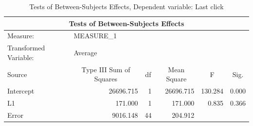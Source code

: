 \documentclass[a4paper]{article}
\begin{document}
\begin{table}[H]
\centering
\caption{Tests of Between-Subjects Effects, Dependent variable: Last click}
\label{tab:betweenlastclick}
\begin{tabular}{|l|r|r|r|l|l|} 
\hline
\multicolumn{6}{|c|}{Tests of Between-Subjects Effects}                                                                                                                                         \\ 
\hline
Measure:~              & \multicolumn{1}{l|}{MEASURE\_1}              & \multicolumn{1}{l|}{}   & \multicolumn{1}{l|}{}            &                              &                             \\ 
\hline
Transformed Variable:~ & \multicolumn{1}{l|}{Average}                 & \multicolumn{1}{l|}{}   & \multicolumn{1}{l|}{}            &                              &                             \\ 
\hline
Source                 & \multicolumn{1}{c|}{Type III Sum of Squares} & \multicolumn{1}{c|}{df} & \multicolumn{1}{c|}{Mean Square} & \multicolumn{1}{c|}{F}       & \multicolumn{1}{c|}{Sig.}   \\ 
\hline
Intercept              & 26696.715                                    & 1                       & 26696.715                        & \multicolumn{1}{r|}{130.284} & \multicolumn{1}{r|}{0.000}  \\ 
\hline
L1                     & 171.000                                      & 1                       & 171.000                          & \multicolumn{1}{r|}{0.835}   & \multicolumn{1}{r|}{0.366}  \\ 
\hline
Error                  & 9016.148                                     & 44                      & 204.912                          & ~                            & ~                           \\
\hline
\end{tabular}
\end{table}
\end{document}
